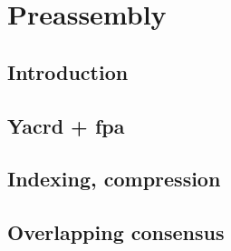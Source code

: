 \documentclass[main.tex]{subfiles}
\begin{document}
\chapter{Preassembly}

\section{Introduction}

\section{Yacrd + fpa}

\section{Indexing, compression}

\section{Overlapping consensus}

\end{document}
